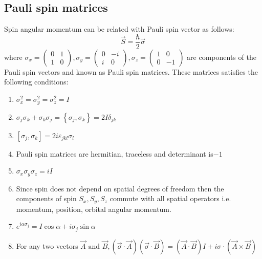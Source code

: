 \subsection{Pauli spin matrices}
Spin angular momentum can be related with Pauli spin vector as follows:
$$
\vec{S}=\frac{\hbar}{2} \vec{\sigma}
$$
where $\sigma_{x}=\left(\begin{array}{ll}0 & 1 \\ 1 & 0\end{array}\right), \sigma_{y}=\left(\begin{array}{cc}0 & -i \\ i & 0\end{array}\right), \sigma_{z}=\left(\begin{array}{cc}1 & 0 \\ 0 & -1\end{array}\right)$ are components of the Pauli spin vectors and known as Pauli spin matrices. These matrices satisfies the following conditions:
\begin{enumerate}[label=\roman*)]
	\item  $\sigma_{x}^{2}=\sigma_{y}^{2}=\sigma_{z}^{2}=I$
	\item  $\sigma_{j} \sigma_{k}+\sigma_{k} \sigma_{j}=\left\{\sigma_{j}, \sigma_{k}\right\}=2 I \delta_{j k}$
	\item $\left[\sigma_{j}, \sigma_{k}\right]=2 i \varepsilon_{j k l} \sigma_{l}$
	\item  Pauli spin matrices are hermitian, traceless and determinant is$-1 $
	\item  $\sigma_{x} \sigma_{y} \sigma_{z}=i I$
	\item  Since spin does not depend on spatial degrees of freedom then the components of spin $S_{x}, S_{y}, S_{z}$ commute with all spatial operators i.e. momentum, position, orbital angular momentum.
	\item $ e^{i \alpha \sigma_{j}}=I \cos \alpha+i \sigma_{j} \sin \alpha$
	\item  For any two vectors $ \vec{A} \text { and } \vec{B},(\vec{\sigma} \cdot \vec{A})(\vec{\sigma} \cdot \vec{B})=(\vec{A} \cdot \vec{B}) I+i \sigma \cdot(\vec{A} \times \vec{B})$
\end{enumerate}

